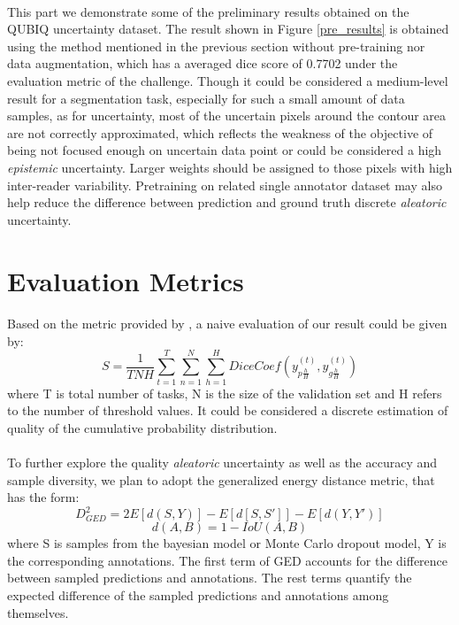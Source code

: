 \documentclass[12pt]{extarticle}
\begin{document}
\paragraph{}
This part we demonstrate some of the preliminary results obtained on the QUBIQ uncertainty dataset.
The result shown in Figure \ref{pre_results} is obtained using the method mentioned in the previous 
section without pre-training nor data augmentation, which has 
a averaged dice score of 0.7702 under the evaluation metric of the challenge. 
Though it could be considered a medium-level result for a segmentation task, especially for such
a small amount of data samples, as for uncertainty, most of the uncertain pixels around the contour area are not 
correctly approximated, which reflects the weakness of the objective of 
being not focused enough on uncertain data point or could be considered a high \textit{epistemic} uncertainty. 
Larger weights should be assigned to those pixels with high inter-reader variability. Pretraining on 
related single annotator dataset may also help reduce the difference between 
prediction and ground truth discrete \textit{aleatoric} uncertainty.
\section{Evaluation Metrics}
\paragraph{}
Based on the metric provided by \cite{qubiq}, a naive evaluation of our result could be given by:
\begin{equation}
    S = \frac{1}{TNH}\sum_{t=1}^{T}\sum_{n=1}^{N}\sum_{h=1}^{H}DiceCoef(y_{p\frac{h}{H}}^{(t)}, y_{g\frac{h}{H}}^{(t)})
\end{equation}
where T is total number of tasks, N is the size of the validation set and H refers to 
the number of threshold values. It could be considered a discrete estimation of quality of the cumulative probability 
distribution.
\paragraph{}
To further explore the quality \textit{aleatoric} uncertainty as well as the accuracy and sample diversity, we plan to 
adopt the generalized energy distance metric, that has the form:
\begin{equation}
    D^2_{GED} = 2E[d(S, Y)] - E[d[S, S']] - E[d(Y, Y')]
\end{equation}
\begin{equation}
    d(A, B) = 1 - IoU(A, B)
\end{equation}
where S is samples from the bayesian model or Monte Carlo dropout model, Y is the corresponding 
annotations. The first term of GED accounts for the difference between sampled predictions
and annotations. The rest terms quantify the expected difference of the sampled predictions and 
annotations among themselves. 
\end{document}
